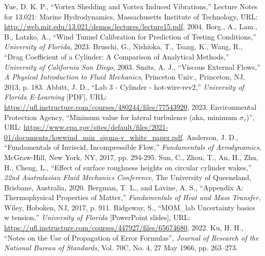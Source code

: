 \documentclass[journal,letterpaper]{IEEEtran}
\begin{document}
\begin{thebibliography}{99}
     Yue, D. K. P., ``Vortex Shedding and Vortex Induced Vibrations,'' Lecture Notes for 13.021: Marine Hydrodynamics, Massachusetts Institute of Technology, URL: \url{http://web.mit.edu/13.021/demos/lectures/lecture15.pdf}, 2004.
     Borg., A., Lam., B., Latzko, A., ``Wind Tunnel Calibration for Prediction of Testing Conditions,'' \textit{University of Florida}, 2023.
     Bruschi, G., Nishioka, T., Tsang, K., Wang, R., ``Drag Coefficient of a Cylinder: A Comparison of Analytical Methods,'' \textit{University of California San Diego}, 2003.
     Smits, A. J., ``Viscous External Flows,'' \textit{A Physical Introduction to Fluid Mechanics}, Princeton Univ., Princeton, NJ, 2013, p. 183.
     Abbitt, J. D., ``Lab 3 - Cylinder - hot-wire-rev2,'' \textit{University of Florida E-Learning} [PDF], URL: \url{https://ufl.instructure.com/courses/480244/files/77543920}, 2023.
     Environmental Protection Agency, ``Minimum value for lateral turbulence (aka, minimum $\sigma_v$)'', URL: \url{https://www.epa.gov/sites/default/files/2021-01/documents/lowwind_min_sigma-v_white_paper.pdf}.
     Anderson, J. D., ``Fundamentals of Inviscid, Incompressible Flow,'' \textit{Fundamentals of Aerodynamics}, McGraw-Hill, New York, NY, 2017, pp. 294-295.
     Sun, C., Zhou, T., An, H., Zhu, H., Cheng, L., ``Effect of surface roughness heights on circular cylinder wakes,'' \textit{22nd Australasian Fluid Mechanics Conference}, The University of Queensland, Brisbane, Australia, 2020.
     Bergman, T. L., and Lavine, A. S., ``Appendix A: Thermophysical Properties of Matter,'' \textit{Fundamentals of Heat and Mass Transfer}, Wiley, Hoboken, NJ, 2017, p. 911.
     Ridgeway, S., ``MOM\_lab Uncertainty basics w tension,'' \textit{University of Florida} [PowerPoint slides], URL: \url{https://ufl.instructure.com/courses/447927/files/65674680}, 2022.
     Ku, H. H., ``Notes on the Use of Propagation of Error Formulas'', \textit{Journal of Research of the National Bureau of Standards}, Vol. 70C, No. 4, 27 May 1966, pp. 263--273.
\end{thebibliography}
\end{document}
